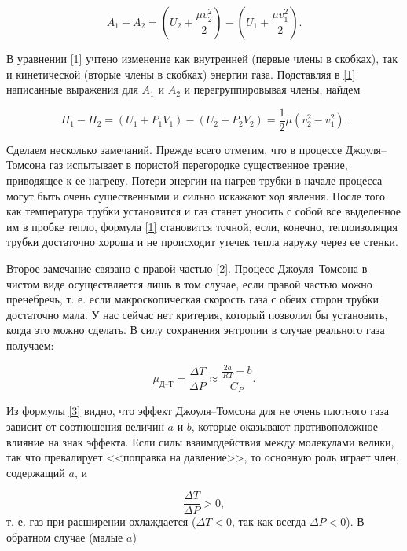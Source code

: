 \documentclass[a4paper, 12pt]{article}
\begin{document}
\begin{equation}\label{1}
	A_1-A_2=\left(U_2+\frac{\mu v_2^2}{2}\right) - \left(U_1 + \frac{\mu v_1^2}{2}\right).
\end{equation}

В уравнении \eqref{1} учтено изменение как внутренней (первые члены в скобках), так и кинетической (вторые члены в скобках) энергии газа. Подставляя в \eqref{1} написанные выражения для $ A_1 $ и $ A_2 $ и перегруппировывая члены, найдем

\begin{equation}\label{2}
	H_1-H_2=\left(U_1+P_1V_1\right) - \left(U_2 + P_2V_2\right) = \frac{1}{2} \mu \left(v^2_2-v^2_1\right).
\end{equation}

Сделаем несколько замечаний. Прежде всего отметим, что в процессе Джоуля–Томсона газ испытывает в пористой перегородке существенное трение, приводящее к ее нагреву. Потери энергии на нагрев трубки в начале процесса могут быть очень существенными и сильно искажают ход явления. После того как температура трубки установится и газ станет уносить с собой все выделенное им в пробке тепло, формула \eqref{1} становится точной, если, конечно, теплоизоляция трубки достаточно хороша и не происходит утечек тепла наружу через ее стенки.

Второе замечание связано с правой частью \eqref{2}. Процесс Джоуля–Томсона в чистом виде осуществляется лишь в том случае, если правой частью можно пренебречь, т. е. если макроскопическая скорость газа с обеих сторон трубки достаточно мала. У нас сейчас нет критерия, который позволил бы установить, когда это можно сделать. В силу сохранения энтропии в случае реального газа получаем:

\begin{equation}\label{3}
	\mu_\text{Д--Т} = \frac{\Delta T}{\Delta P} \approx \frac{\frac{2a}{RT} - b}{C_P}.
\end{equation}

Из формулы \eqref{3} видно, что эффект Джоуля–Томсона для не очень плотного газа зависит от соотношения величин $ a $ и $ b $, которые оказывают противоположное влияние на знак эффекта. Если силы взаимодействия между молекулами велики, так что превалирует <<поправка на давление>>, то основную роль играет член, содержащий $a$, и 

$$ \frac{\Delta T}{\Delta P} > 0, $$
т. е. газ при расширении охлаждается ($ \Delta T < 0 $, так как всегда $ \Delta P < 0 $). В обратном случае (малые $ a $)
\end{document}
